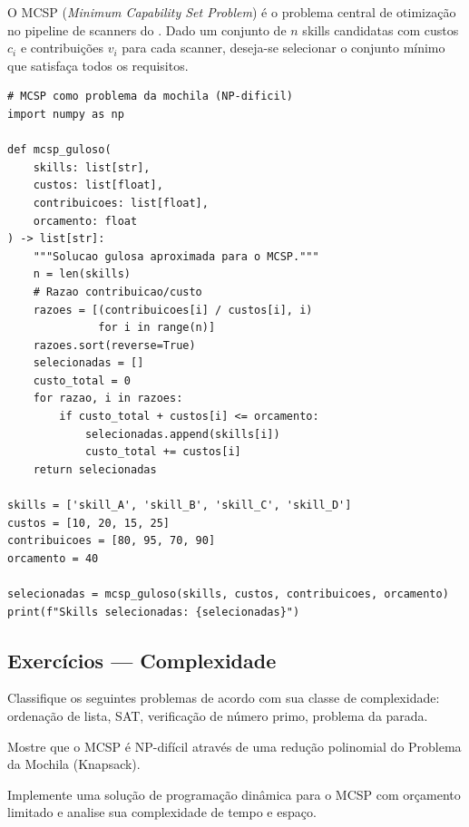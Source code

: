 O MCSP (\textit{Minimum Capability Set Problem}) é o problema central de
otimização no pipeline de scanners do \opencodeeco{} \cite{opencode2026scanner,
opencode2026spec036}. Dado um conjunto de $n$ skills candidatas com custos
$c_i$ e contribuições $v_i$ para cada scanner, deseja-se selecionar o
conjunto mínimo que satisfaça todos os requisitos.

\begin{lstlisting}[style=pythonstyle]
# MCSP como problema da mochila (NP-dificil)
import numpy as np

def mcsp_guloso(
    skills: list[str],
    custos: list[float],
    contribuicoes: list[float],
    orcamento: float
) -> list[str]:
    """Solucao gulosa aproximada para o MCSP."""
    n = len(skills)
    # Razao contribuicao/custo
    razoes = [(contribuicoes[i] / custos[i], i)
              for i in range(n)]
    razoes.sort(reverse=True)
    selecionadas = []
    custo_total = 0
    for razao, i in razoes:
        if custo_total + custos[i] <= orcamento:
            selecionadas.append(skills[i])
            custo_total += custos[i]
    return selecionadas

skills = ['skill_A', 'skill_B', 'skill_C', 'skill_D']
custos = [10, 20, 15, 25]
contribuicoes = [80, 95, 70, 90]
orcamento = 40

selecionadas = mcsp_guloso(skills, custos, contribuicoes, orcamento)
print(f"Skills selecionadas: {selecionadas}")
\end{lstlisting}

\subsection{Exercícios — Complexidade}

\begin{exercicio}
    Classifique os seguintes problemas de acordo com sua classe de
    complexidade: ordenação de lista, SAT, verificação de número primo,
    problema da parada.
\end{exercicio}

\begin{exercicio}
    Mostre que o MCSP é NP-difícil através de uma redução polinomial do
    Problema da Mochila (Knapsack).
\end{exercicio}

\begin{exercicio}
    Implemente uma solução de programação dinâmica para o MCSP com
    orçamento limitado e analise sua complexidade de tempo e espaço.
\end{exercicio}

